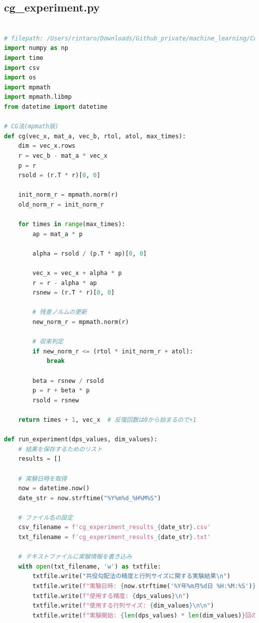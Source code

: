 \documentclass{article}
\begin{document}
\subsection{cg\_experiment.py}
\begin{lstlisting}[language=Python, caption=cg\_experiment.py]

# filepath: /Users/rintaro/Downloads/Github_private/machine_learning/ConjugateGradientMethodreport/cg_experiment.py
import numpy as np
import time
import csv
import os
import mpmath
import mpmath.libmp
from datetime import datetime

# CG法(mpmath版)
def cg(vec_x, mat_a, vec_b, rtol, atol, max_times):
    dim = vec_x.rows
    r = vec_b - mat_a * vec_x
    p = r
    rsold = (r.T * r)[0, 0]

    init_norm_r = mpmath.norm(r)
    old_norm_r = init_norm_r
    
    for times in range(max_times):
        ap = mat_a * p
        
        alpha = rsold / (p.T * ap)[0, 0]
        
        vec_x = vec_x + alpha * p
        r = r - alpha * ap
        rsnew = (r.T * r)[0, 0]

        # 残差ノルムの更新
        new_norm_r = mpmath.norm(r)
        
        # 収束判定
        if new_norm_r <= (rtol * init_norm_r + atol):
            break
        
        beta = rsnew / rsold
        p = r + beta * p
        rsold = rsnew
        
    return times + 1, vec_x  # 反復回数は0から始まるので+1

def run_experiment(dps_values, dim_values):
    # 結果を保存するためのリスト
    results = []
    
    # 実験日時を取得
    now = datetime.now()
    date_str = now.strftime("%Y%m%d_%H%M%S")
    
    # ファイル名の設定
    csv_filename = f'cg_experiment_results_{date_str}.csv'
    txt_filename = f'cg_experiment_results_{date_str}.txt'
    
    # テキストファイルに実験情報を書き込み
    with open(txt_filename, 'w') as txtfile:
        txtfile.write("共役勾配法の精度と行列サイズに関する実験結果\n")
        txtfile.write(f"実験日時: {now.strftime('%Y年%m月%d日 %H:%M:%S')}\n\n")
        txtfile.write(f"使用する精度: {dps_values}\n")
        txtfile.write(f"使用する行列サイズ: {dim_values}\n\n")
        txtfile.write(f"実験開始: {len(dps_values) * len(dim_values)}回の実験を実行します\n\n")
    

\end{lstlisting}
\end{document}
